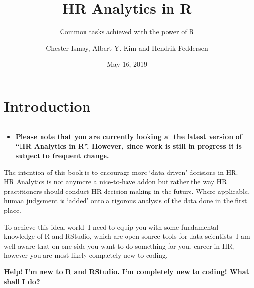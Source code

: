 \documentclass[
  12pt, krantz2,
]{krantz}
\title{HR Analytics in R}
\subtitle{Common tasks achieved with the power of R}
\author{Chester Ismay, Albert Y. Kim and Hendrik Feddersen}
\date{May 16, 2019}
\newenvironment{rmdblock}[1]
  {\begin{shaded*}
  \begin{itemize}
  \renewcommand{\labelitemi}{
    \raisebox{-.7\height}[0pt][0pt]{
    }
  }
  \item
  }
  {
  \end{itemize}
  \end{shaded*}
  }
\newenvironment{learncheck}
  {\begin{rmdblock}{warning}}
  {\end{rmdblock}}
\begin{document}
\maketitle


\thispagestyle{empty}

\begin{center}
\end{center}

\setlength{\abovedisplayskip}{-5pt}
\setlength{\abovedisplayshortskip}{-5pt}

{
\hypersetup{linkcolor=}
\setcounter{tocdepth}{2}
\tableofcontents
}
\listoftables
\listoffigures
\mainmatter

\hypertarget{intro}{%
\chapter{Introduction}\label{intro}}

\begin{center}\rule{0.5\linewidth}{\linethickness}\end{center}

\begin{learncheck}
\textbf{Please note that you are currently looking at the latest version
of ``HR Analytics in R''. However, since work is still in progress it is
subject to frequent change.}
\end{learncheck}

The intention of this book is to encourage more `data driven' decisions in HR. HR Analytics is not anymore a nice-to-have addon but rather the way HR practitioners should conduct HR decision making in the future. Where applicable, human judgement is `added' onto a rigorous analysis of the data done in the first place.

To achieve this ideal world, I need to equip you with some fundamental knowledge of R and RStudio, which are open-source tools for data scientists. I am well aware that on one side you want to do something for your career in HR, however you are most likely completely new to coding.

\textbf{Help! I'm new to R and RStudio. I'm completely new to coding! What shall I do?}
\end{document}
